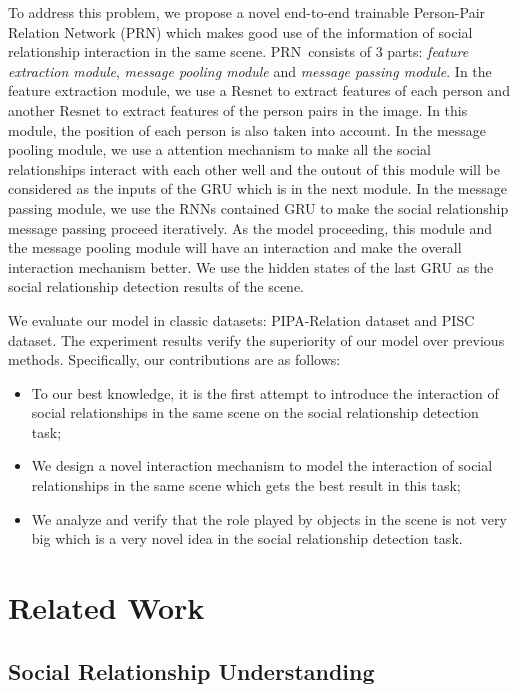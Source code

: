 \documentclass{article}
\newcommand{\PRN}{{\sf PRN}}
\begin{document}
To address this problem, we propose a novel end-to-end trainable Person-Pair Relation Network (\PRN) which makes good use of the information of social relationship interaction in the same scene. \PRN \ consists of 3 parts:  \emph{feature extraction module}, \emph{message pooling module} and \emph{message passing module}. In the feature extraction module, we use a Resnet\cite{DBLP:conf/cvpr/HeZRS16} to extract features of each person and another Resnet to extract features of the person pairs in the image. In this module, the position of each person is also taken into account. In the message pooling module, we use a attention mechanism to make all the social relationships interact with each other well and the outout of this module will be considered as the inputs of the GRU which is in the next module. In the message passing module,  we use the RNNs contained GRU to make the social relationship message passing proceed iteratively. As the model proceeding, this module and the message pooling module will have an interaction and make the overall interaction mechanism better. We use the hidden states of the last GRU as the social relationship detection results of the scene.

We evaluate our model in classic datasets: PIPA-Relation dataset and PISC dataset. The experiment results verify the superiority of our model over previous methods. Specifically, our contributions are as follows:
\begin{itemize}
	\item To our best knowledge, it is the first attempt to introduce the interaction of social relationships in the same scene on the social relationship detection task;
	\item We design a novel interaction mechanism to model the interaction of social relationships in the same scene which gets the best result in this task;
	\item We analyze and verify that the role played by objects in the scene is not very big which is a very novel idea in the social relationship detection task.
\end{itemize}


\section{Related Work}

\subsection{Social Relationship Understanding}
\end{document}
